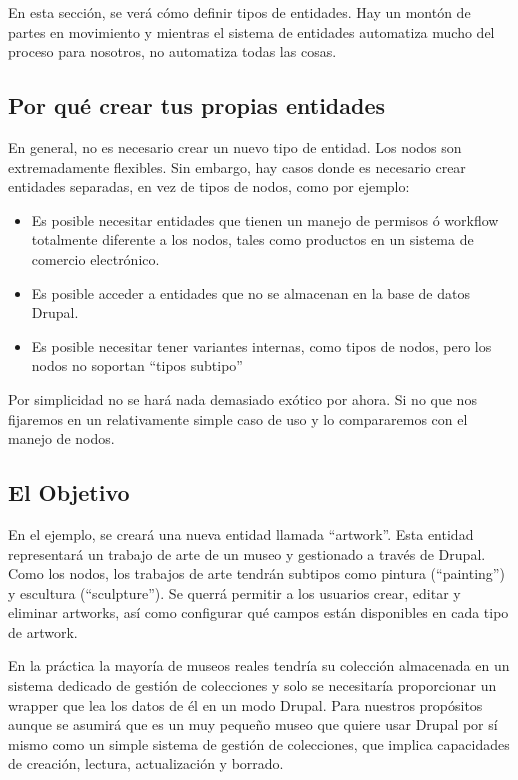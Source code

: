 \documentclass[11pt]{article}
\begin{document}
{{En esta sección, se verá cómo definir tipos de entidades. Hay un
montón de partes en movimiento y mientras el sistema de entidades
automatiza mucho del proceso para nosotros, no automatiza todas las
cosas.

\subsection{Por qué crear tus propias entidades}
\label{sec-4.16}


En general, no es necesario crear un nuevo tipo de entidad. Los nodos
son extremadamente flexibles. Sin embargo, hay casos donde es
necesario crear entidades separadas, en vez de tipos de nodos, como
por ejemplo:

\begin{itemize}
\item Es posible necesitar entidades que tienen un manejo de permisos ó
  workflow totalmente diferente a los nodos, tales como productos en
  un sistema de comercio electrónico.
\item Es posible acceder a entidades que no se almacenan en la base de
  datos Drupal.
\item Es posible necesitar tener variantes internas, como tipos de nodos,
  pero los nodos no soportan “tipos subtipo”
\end{itemize}
Por simplicidad no se hará nada demasiado exótico por ahora. Si no que
nos fijaremos en un relativamente simple caso de uso y lo compararemos
con el manejo de nodos.

\subsection{El Objetivo}
\label{sec-4.17}


En el ejemplo, se creará una nueva entidad llamada “artwork”. Esta
entidad representará un trabajo de arte de un museo y gestionado a
través de Drupal. Como los nodos, los trabajos de arte tendrán
subtipos como pintura (“painting”) y escultura (“sculpture”). Se
querrá permitir a los usuarios crear, editar y eliminar artworks, así
como configurar qué campos están disponibles en cada tipo de artwork.

En la práctica la mayoría de museos reales tendría su colección
almacenada en un sistema dedicado de gestión de colecciones y solo se
necesitaría proporcionar un wrapper que lea los datos de él en un modo
Drupal. Para nuestros propósitos aunque se asumirá que es un muy
pequeño museo que quiere usar Drupal por sí mismo como un simple
sistema de gestión de colecciones, que implica capacidades de
creación, lectura, actualización y borrado.

}}
\end{document}
